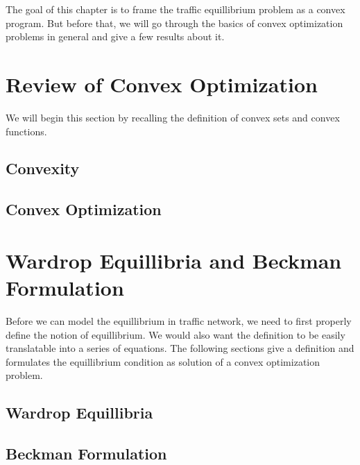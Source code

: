 The goal of this chapter is to  frame the traffic equillibrium problem
as a convex program. But before that, we will go through the basics of
convex optimization problems in general and give a few
results about it.


\section{Review of Convex Optimization}
	We will begin this section by recalling
	the definition of convex sets and convex functions.

	\subsection{Convexity}
	

	\subsection{Convex Optimization}
	
	


\section{Wardrop Equillibria and Beckman Formulation}
	Before we can model the equillibrium in traffic network, we need
	to first properly define the notion of equillibrium. We would also
	want the definition to be easily translatable into a series of
	equations. The following sections give a definition and
	formulates the equillibrium condition as solution of a
	convex optimization problem.

	\subsection{Wardrop Equillibria}
	
	

	\subsection{Beckman Formulation}\label{sec:beckman}
	
